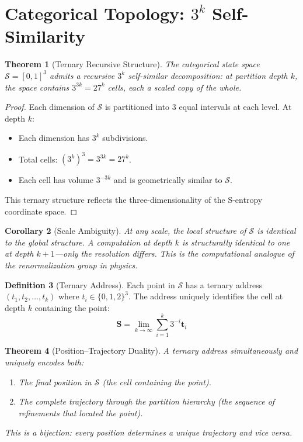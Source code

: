 \documentclass[twocolumn,10pt,a4paper]{article}
\theoremstyle{plain}
\newtheorem{theorem}{Theorem}[section]
\newtheorem{corollary}[theorem]{Corollary}
\theoremstyle{definition}
\newtheorem{definition}[theorem]{Definition}
\theoremstyle{remark}
\newcommand{\Sspace}{\mathcal{S}}
\newcommand{\Scoord}{\mathbf{S}}
\begin{document}
\section{Categorical Topology: $3^k$ Self-Similarity}
\label{sec:topology}

\begin{theorem}[Ternary Recursive Structure]
\label{thm:ternary}
The categorical state space $\Sspace = [0,1]^3$ admits a recursive $3^k$ self-similar decomposition: at partition depth $k$, the space contains $3^{3k} = 27^k$ cells, each a scaled copy of the whole.
\end{theorem}

\begin{proof}
Each dimension of $\Sspace$ is partitioned into 3 equal intervals at each level. At depth $k$:
\begin{itemize}
    \item Each dimension has $3^k$ subdivisions.
    \item Total cells: $(3^k)^3 = 3^{3k} = 27^k$.
    \item Each cell has volume $3^{-3k}$ and is geometrically similar to $\Sspace$.
\end{itemize}
This ternary structure reflects the three-dimensionality of the S-entropy coordinate space.
\end{proof}

\begin{corollary}[Scale Ambiguity]
At any scale, the local structure of $\Sspace$ is identical to the global structure. A computation at depth $k$ is structurally identical to one at depth $k+1$---only the resolution differs. This is the computational analogue of the renormalization group in physics.
\end{corollary}

\begin{definition}[Ternary Address]
\label{def:ternary_addr}
Each point in $\Sspace$ has a ternary address $(t_1, t_2, \ldots, t_k)$ where $t_i \in \{0, 1, 2\}^3$. The address uniquely identifies the cell at depth $k$ containing the point:
\begin{equation}
    \Scoord = \lim_{k \to \infty} \sum_{i=1}^{k} 3^{-i} \mathbf{t}_i
\end{equation}
\end{definition}

\begin{theorem}[Position--Trajectory Duality]
\label{thm:pos_traj}
A ternary address simultaneously and uniquely encodes both:
\begin{enumerate}
    \item The \emph{final position} in $\Sspace$ (the cell containing the point).
    \item The \emph{complete trajectory} through the partition hierarchy (the sequence of refinements that located the point).
\end{enumerate}
This is a bijection: every position determines a unique trajectory and vice versa.
\end{theorem}
\end{document}
